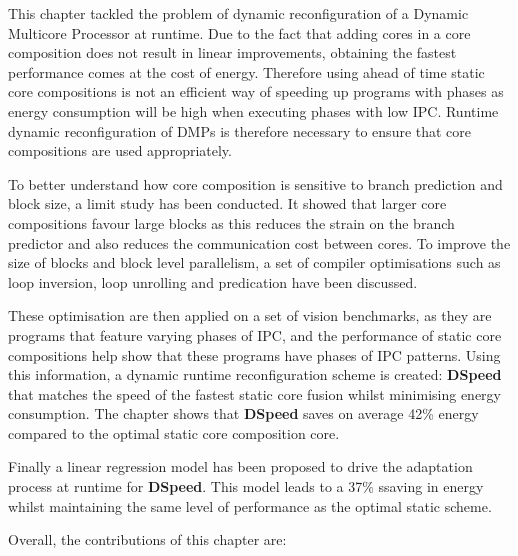 This chapter tackled the problem of dynamic reconfiguration of a Dynamic Multicore Processor at runtime.
Due to the fact that adding cores in a core composition does not result in linear improvements, obtaining the fastest performance comes at the cost of energy.
Therefore using ahead of time static core compositions is not an efficient way of speeding up programs with phases as energy consumption will be high when executing phases with low IPC. %
Runtime dynamic reconfiguration of DMPs is therefore necessary to ensure that core compositions are used appropriately.

To better understand how core composition is sensitive to branch prediction and block size, a limit study has been conducted.
It showed that larger core compositions favour large blocks as this reduces the strain on the branch predictor and also reduces the communication cost between cores.
To improve the size of blocks and block level parallelism, a set of compiler optimisations such as loop inversion, loop unrolling and predication have been discussed.

These optimisation are then applied on a set of vision benchmarks, as they are programs that feature varying phases of IPC, and the performance of static core compositions help show that these programs have phases of IPC patterns.
Using this information, a dynamic runtime reconfiguration scheme is created:  \textbf{DSpeed} that matches the speed of the fastest static core fusion whilst minimising energy consumption.%
The chapter shows that \textbf{DSpeed} saves on average 42\% energy compared to the optimal static core composition core.%

Finally a linear regression model has been proposed to drive the adaptation process at runtime for \textbf{DSpeed}.
This model leads to a 37\% ssaving in energy whilst maintaining the same level of performance as the optimal static scheme.

Overall, the contributions of this chapter are:


